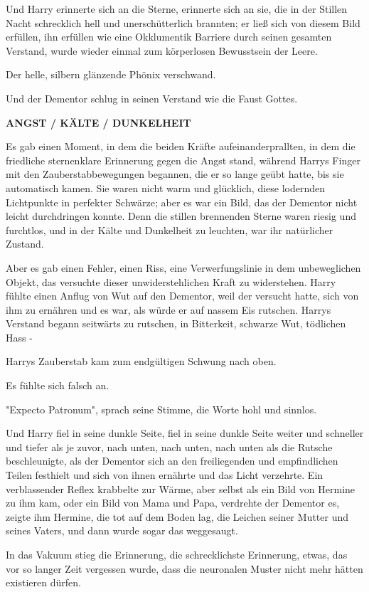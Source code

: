 {Und Harry erinnerte sich an die Sterne, erinnerte sich an sie, die in der Stillen Nacht schrecklich hell und unerschütterlich brannten; er ließ sich von diesem Bild erfüllen, ihn erfüllen wie eine Okklumentik Barriere durch seinen gesamten Verstand, wurde wieder einmal zum körperlosen Bewusstsein der Leere.

Der helle, silbern glänzende Phönix verschwand.

Und der Dementor schlug in seinen Verstand wie die Faust Gottes.

\textbf{\textbf{ANGST / KÄLTE / DUNKELHEIT}}

Es gab einen Moment, in dem die beiden Kräfte aufeinanderprallten, in dem die friedliche sternenklare Erinnerung gegen die Angst stand, während Harrys Finger mit den Zauberstabbewegungen begannen, die er so lange geübt hatte, bis sie automatisch kamen. Sie waren nicht warm und glücklich, diese lodernden Lichtpunkte in perfekter Schwärze; aber es war ein Bild, das der Dementor nicht leicht durchdringen konnte. Denn die stillen brennenden Sterne waren riesig und furchtlos, und in der Kälte und Dunkelheit zu leuchten, war ihr natürlicher Zustand.

Aber es gab einen Fehler, einen Riss, eine Verwerfungslinie in dem unbeweglichen Objekt, das versuchte dieser unwiderstehlichen Kraft zu widerstehen. Harry fühlte einen Anflug von Wut auf den Dementor, weil der versucht hatte, sich von ihm zu ernähren und es war, als würde er auf nassem Eis rutschen. Harrys Verstand begann seitwärts zu rutschen, in Bitterkeit, schwarze Wut, tödlichen Hass -

Harrys Zauberstab kam zum endgültigen Schwung nach oben.

Es fühlte sich falsch an.

"Expecto Patronum", sprach seine Stimme, die Worte hohl und sinnlos.

Und Harry fiel in seine dunkle Seite, fiel in seine dunkle Seite weiter und schneller und tiefer als je zuvor, nach unten, nach unten, nach unten als die Rutsche beschleunigte, als der Dementor sich an den freiliegenden und empfindlichen Teilen festhielt und sich von ihnen ernährte und das Licht verzehrte. Ein verblassender Reflex krabbelte zur Wärme, aber selbst als ein Bild von Hermine zu ihm kam, oder ein Bild von Mama und Papa, verdrehte der Dementor es, zeigte ihm Hermine, die tot auf dem Boden lag, die Leichen seiner Mutter und seines Vaters, und dann wurde sogar das weggesaugt.

In das Vakuum stieg die Erinnerung, die schrecklichste Erinnerung, etwas, das vor so langer Zeit vergessen wurde, dass die neuronalen Muster nicht mehr hätten existieren dürfen.

}
